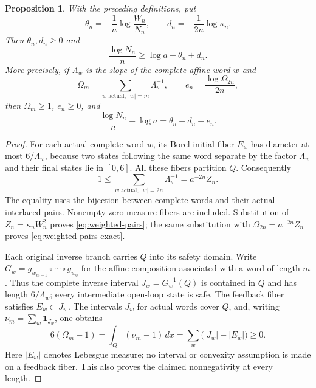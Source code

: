 \documentclass[11pt,reqno]{amsart}
\numberwithin{equation}{section}
\newtheorem{proposition}[theorem]{Proposition}
\theoremstyle{definition}
\theoremstyle{definition}
\newcommand{\one}{\mathbf 1}
\begin{document}
\begin{proposition}\label{prop:weighted-pairs}
With the preceding definitions, put
\[
 \theta_n=-\frac1n\log\frac{W_n}{N_n},\qquad
 d_n=-\frac1{2n}\log\kappa_n.
\]
Then $\theta_n,d_n\ge0$ and
\begin{equation}\label{eq:weighted-pairs}
 \frac{\log N_n}{n}\ge\log a+\theta_n+d_n.
\end{equation}
More precisely, if $\Lambda_w$ is the slope of the complete
affine word $w$ and
\[
 \Omega_m=\sum_{w\text{ actual},\ |w|=m}\Lambda_w^{-1},
 \qquad e_n=\frac{\log\Omega_{2n}}{2n},
\]
then $\Omega_m\ge1$, $e_n\ge0$, and
\begin{equation}\label{eq:weighted-pairs-exact}
 \frac{\log N_n}{n}-\log a=\theta_n+d_n+e_n.
\end{equation}
\end{proposition}
\begin{proof}
For each actual complete word $w$, its Borel initial fiber
$E_w$ has diameter at most $6/\Lambda_w$, because two states
following the same word separate by the factor $\Lambda_w$
and their final states lie in $[0,6]$. All these fibers partition
$Q$. Consequently
\[
 1\le\sum_{w\text{ actual},\ |w|=2n}\Lambda_w^{-1}
       =a^{-2n}Z_n.
\]
The equality uses the bijection between complete words and their
actual interlaced pairs. Nonempty zero-measure fibers are included.
Substitution of $Z_n=\kappa_nW_n^2$ proves
\eqref{eq:weighted-pairs}; the same substitution with
$\Omega_{2n}=a^{-2n}Z_n$ proves
\eqref{eq:weighted-pairs-exact}.

Each original inverse branch carries $Q$ into its safety domain.
Write $G_w=g_{w_{m-1}}\circ\cdots\circ g_{w_0}$ for the affine
composition associated with a word of length $m$.
Thus the complete inverse interval $J_w=G_w^{-1}(Q)$ is contained
in $Q$ and has length $6/\Lambda_w$; every intermediate open-loop
state is safe. The feedback fiber satisfies $E_w\subset J_w$.
The intervals $J_w$ for actual words cover $Q$, and, writing
$\nu_m=\sum_w\one_{J_w}$, one obtains
\[
 6(\Omega_m-1)=\int_Q(\nu_m-1)\,dx
              =\sum_w\bigl(|J_w|-|E_w|\bigr)\ge0.
\]
Here $|E_w|$ denotes Lebesgue measure; no interval or convexity
assumption is made on a feedback fiber. This also proves the
claimed nonnegativity at every length.
\end{proof}
\end{document}

